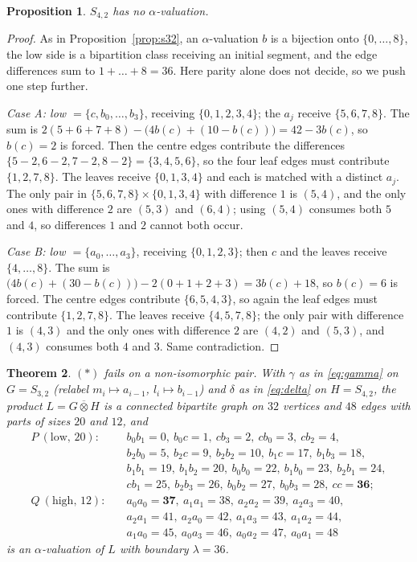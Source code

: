 \documentclass[11pt]{amsart}
\newtheorem{theorem}{Theorem}
\newtheorem{proposition}[theorem]{Proposition}
\theoremstyle{definition}
\theoremstyle{remark}
\newcommand{\wtp}{\mathbin{\overline{\otimes}}}
\begin{document}
\begin{proposition}\label{prop:s42}
$S_{4,2}$ has no $\alpha$-valuation.
\end{proposition}

\begin{proof}
As in Proposition~\ref{prop:s32}, an $\alpha$-valuation $b$ is a bijection onto
$\{0,\dots,8\}$, the low side is a bipartition class receiving an initial
segment, and the edge differences sum to $1+\dots+8=36$. Here parity alone does
not decide, so we push one step further.

\emph{Case A: low $=\{c,b_0,\dots,b_3\}$}, receiving $\{0,1,2,3,4\}$; the $a_j$
receive $\{5,6,7,8\}$. The sum is
$2(5{+}6{+}7{+}8)-\bigl(4b(c)+(10-b(c))\bigr)=42-3b(c)$, so $b(c)=2$ is
forced. Then the centre edges contribute the differences
$\{5{-}2,6{-}2,7{-}2,8{-}2\}=\{3,4,5,6\}$, so the four leaf edges must
contribute $\{1,2,7,8\}$. The leaves receive $\{0,1,3,4\}$ and each is matched
with a distinct $a_j$. The only pair in
$\{5,6,7,8\}\times\{0,1,3,4\}$ with difference $1$ is $(5,4)$, and the only
ones with difference $2$ are $(5,3)$ and $(6,4)$; using $(5,4)$ consumes both
$5$ and $4$, so differences $1$ and $2$ cannot both occur.

\emph{Case B: low $=\{a_0,\dots,a_3\}$}, receiving $\{0,1,2,3\}$; then $c$ and
the leaves receive $\{4,\dots,8\}$. The sum is
$\bigl(4b(c)+(30-b(c))\bigr)-2(0{+}1{+}2{+}3)=3b(c)+18$, so $b(c)=6$ is
forced. The centre edges contribute $\{6,5,4,3\}$, so again the leaf edges must
contribute $\{1,2,7,8\}$. The leaves receive $\{4,5,7,8\}$; the only pair with
difference $1$ is $(4,3)$ and the only ones with difference $2$ are $(4,2)$
and $(5,3)$, and $(4,3)$ consumes both $4$ and $3$. Same contradiction.
\end{proof}

\begin{theorem}\label{thm:distinct}
$(\ast)$ fails on a non-isomorphic pair. With $\gamma$ as in
\eqref{eq:gamma} on $G=S_{3,2}$ (relabel $m_i\mapsto a_{i-1}$,
$l_i\mapsto b_{i-1}$) and $\delta$ as in \eqref{eq:delta} on $H=S_{4,2}$, the
product $L=G\wtp H$ is a connected bipartite graph on $32$ vertices and $48$
edges with parts of sizes $20$ and $12$, and
\begin{align*}
 P\ (\text{low, }20):\quad & b_0b_1=0,\ b_0c=1,\ cb_3=2,\ cb_0=3,\ cb_2=4,\\
 & b_2b_0=5,\ b_2c=9,\ b_2b_2=10,\ b_1c=17,\ b_1b_3=18,\\
 & b_1b_1=19,\ b_1b_2=20,\ b_0b_0=22,\ b_1b_0=23,\ b_2b_1=24,\\
 & cb_1=25,\ b_2b_3=26,\ b_0b_2=27,\ b_0b_3=28,\ cc=\mathbf{36};\\[2pt]
 Q\ (\text{high, }12):\quad
 & a_0a_0=\mathbf{37},\ a_1a_1=38,\ a_2a_2=39,\ a_2a_3=40,\\
 & a_2a_1=41,\ a_2a_0=42,\ a_1a_3=43,\ a_1a_2=44,\\
 & a_1a_0=45,\ a_0a_3=46,\ a_0a_2=47,\ a_0a_1=48
\end{align*}
is an $\alpha$-valuation of $L$ with boundary $\lambda=36$.
\end{theorem}
\end{document}
